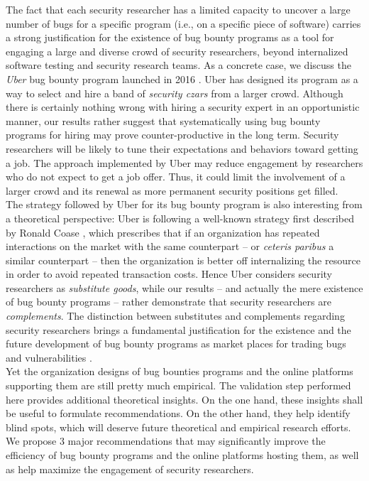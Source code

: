 The fact that each security researcher has a limited capacity to uncover a large number of bugs for a specific program (i.e., on a specific piece of software) carries a strong justification for the existence of bug bounty programs as a tool for engaging a large and diverse crowd of security researchers, beyond internalized software testing and security research teams. As a concrete case, we discuss the {\it Uber} bug bounty program launched in 2016 \cite{moussouris2016}. Uber has designed its program as a way to select and hire a band of {\it security czars} from a larger crowd. Although there is certainly nothing wrong with hiring a security expert in an opportunistic manner, our results rather suggest that systematically using bug bounty programs for hiring may prove counter-productive in the long term. Security researchers will be likely to tune their expectations and behaviors toward getting a job. The approach implemented by Uber may reduce engagement by researchers who do not expect to get a job offer. Thus, it could limit the involvement of a larger crowd and its renewal as more permanent security positions get filled. \\

The strategy followed by Uber for its bug bounty program is also interesting from a theoretical perspective: Uber is following a well-known strategy first described by Ronald Coase \cite{coase1937}, which prescribes that if an organization has repeated interactions on the market with the same counterpart -- or {\it ceteris paribus} a similar counterpart -- then the organization is better off internalizing the resource in order to avoid repeated transaction costs. Hence Uber considers security researchers as {\it substitute goods}, while our results -- and actually the mere existence of bug bounty programs -- rather demonstrate that security researchers are {\it complements}. The distinction between substitutes and complements regarding security researchers brings a fundamental justification for the existence and the future development of bug bounty programs as market places for trading bugs and vulnerabilities \cite{bohme2006comparison}. \\

Yet the organization designs of bug bounties programs and the online platforms supporting them are still pretty much empirical. The validation step performed here provides additional theoretical insights. On the one hand, these insights shall be useful to formulate recommendations. On the other hand, they help identify blind spots, which will deserve future theoretical and empirical research efforts. We propose 3 major recommendations that may significantly improve the efficiency of bug bounty programs and the online platforms hosting them, as well as help maximize the engagement of security researchers. 

